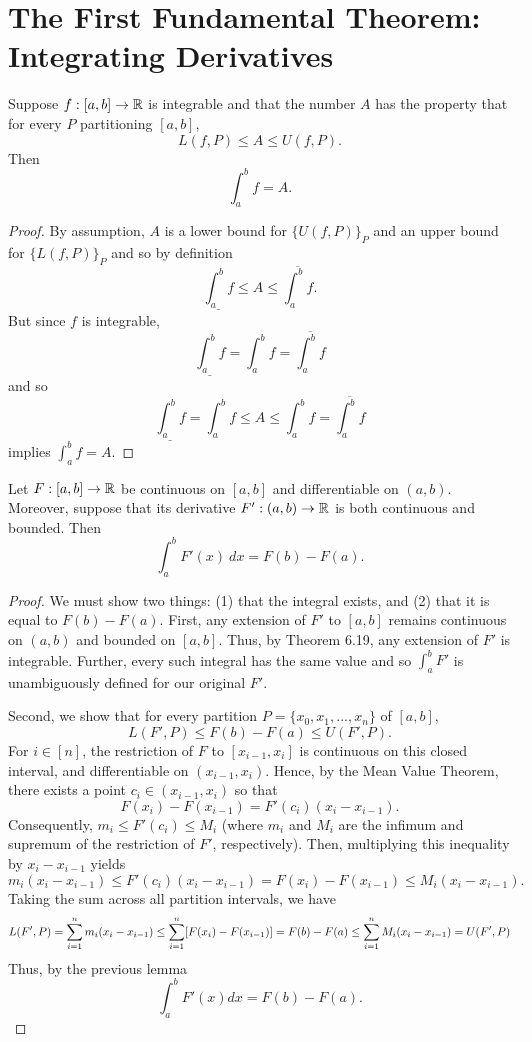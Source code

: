 \documentclass[letterpaper, twoside, 12pt]{book}
\begin{document}
\section{The First Fundamental Theorem: Integrating Derivatives}


\begin{lemma}[6.21]
  Suppose \(f:[a,b]\to\mathbb R\) is integrable and that the number \(A\) has
  the property that for every \(P\) partitioning \([a,b]\),
  \[
    L(f,P) \leq A \leq U(f,P)
  .\]
  Then
  \[
    \int_a^b f = A
  .\]
\end{lemma}

\begin{proof}
    By assumption, \(A\) is a lower bound for \(\{U(f, P)\}_P\)
    and an upper bound for \(\{L(f, P)\}_P\) and so by definition
    \[ \underline{\int_a^b f} \leq A \leq \overline{\int_a^b f} .\]
    But since \(f\) is integrable, 
    \[ \underline{\int_a^b f} = \int_a^b f = \overline{\int_a^b f} \]
    and so 
    \[\underline{\int_a^b f } = \int_a^b f \leq A \leq \int_a^b f = \overline{\int_a^b f} \] 
    implies \(\int_a^b f = A\).
\end{proof}


\begin{theorem}
  Let \(F:[a,b]\to\mathbb R\) be continuous on \([a,b]\) and differentiable on
  \((a,b)\). Moreover, suppose that its derivative
  \(F':(a,b)\to\mathbb R\) is both continuous and bounded. Then
  \[
    \int_a^b F'(x)~dx
      =
    F(b)-F(a)
  .\]
\end{theorem}

\begin{proof}
    We must show two things: (1) that the integral exists, and (2) that it
    is equal to \(F(b) - F(a)\). First, any extension of \(F'\) to \([a,b]\)
    remains continuous on \((a,b)\) and bounded on \([a,b]\). Thus, by Theorem
    6.19, any extension of \(F'\) is integrable. Further, every such integral
    has the same value and so \(\int_a^b F'\) is unambiguously defined for
    our original \(F'\).
    
    Second, we show that for every partition \(P = \{x_0, x_1, ..., x_n\}\) 
    of \([a,b]\),
    \[ L(F', P) \leq F(b) - F(a) \leq U(F', P) .\]
    For \(i \in [n]\), the restriction of \(F\) to \([x_{i-1}, x_i]\) is
    continuous on this closed interval, and differentiable on \((x_{i-1}, x_i)\).
    Hence, by the Mean Value Theorem, there exists a point \(c_i \in (x_{i-1}, x_i)\)
    so that 
    \[ F(x_i) - F(x_{i-1}) = F'(c_i)(x_i - x_{i-1}) .\]
    Consequently, \(m_i \leq F'(c_i) \leq M_i\) (where \(m_i\) and \(M_i\) are the infimum
    and supremum of the restriction of \(F'\), respectively). Then, multiplying this 
    inequality by \(x_i - x_{i-1}\) yields
    \[ m_i (x_i - x_{i-1}) \leq F'(c_i)(x_i - x_{i-1}) = F(x_i) - F(x_{i-1}) \leq M_i (x_i - x_{i-1}) .\]
    Taking the sum across all partition intervals, we have
    \[ L(F', P) = \sum_{i = 1}^n m_i(x_i - x_{i-1}) \leq \sum_{i = 1}^n [F(x_i) - F(x_{i-1}) ] = F(b) - F(a) \leq \sum_{i = 1}^n M_i (x_i - x_{i-1}) = U(F', P) \] 
    Thus, by the previous lemma
    \[ \int_a^b F'(x) dx = F(b) - F(a) .\]
\end{proof}
\end{document}
